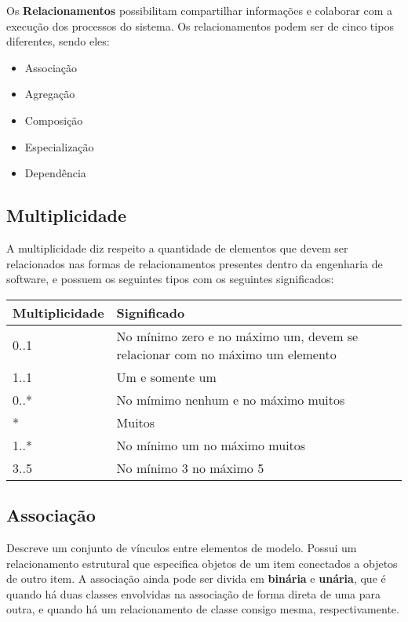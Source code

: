 \documentclass[12pt a4paper]{paper}
\begin{document}
Os \textbf{Relacionamentos} possibilitam compartilhar informações  e colaborar com a 
execução dos processos do sistema. Os relacionamentos podem ser de cinco tipos 
diferentes, sendo eles: 

\begin{itemize}
  \item Associação 
  \item Agregação 
  \item Composição 
  \item Especialização 
  \item Dependência
\end{itemize}

\subsection{Multiplicidade} %
\label{sub:Multiplicidade}
A multiplicidade diz respeito a quantidade de elementos que devem ser relacionados nas 
formas de relacionamentos presentes dentro da engenharia de software, e possuem os 
seguintes tipos com os seguintes significados:

\begin{center}
  \begin{tabular}{| m{2.5cm} | m{8cm} |}
  \hline
  \textbf{Multiplicidade} & \textbf{Significado} \\
  \hline
  0..1 & No mínimo zero e no máximo um, devem se relacionar com no máximo um elemento \\
  \hline
  1..1 & Um e somente um \\
  \hline
  0..* & No mímimo nenhum e no máximo muitos \\
  \hline
  * & Muitos \\
  \hline
  1..* & No mínimo um no máximo muitos \\
  \hline
  3..5 & No mínimo 3 no máximo 5 \\
\hline
\end{tabular}
\end{center}



\subsection{Associação} %
\label{sub:Associação}
Descreve um conjunto de vínculos entre elementos de modelo. Possui um relacionamento 
estrutural que especifica objetos de um item conectados a objetos de outro item. A 
associação ainda pode ser divida em \textbf{binária} e \textbf{unária}, que é quando 
há duas classes envolvidas na associação de forma direta de uma para outra, e quando 
há um relacionamento de classe consigo mesma, respectivamente. 
\end{document}
